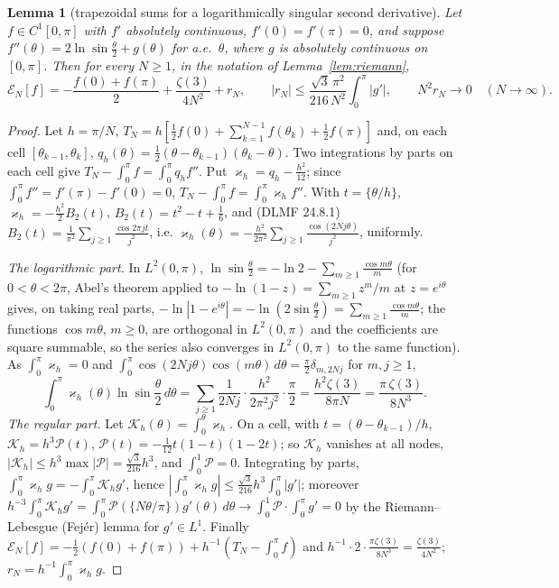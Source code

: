 \documentclass[11pt,a4paper]{article}
\theoremstyle{plain}
\newtheorem{lemma}[theorem]{Lemma}
\theoremstyle{definition}
\numberwithin{equation}{section}
\begin{document}
\begin{lemma}[trapezoidal sums for a logarithmically singular second derivative]\label{lem:traplog}
Let $f\in C^1[0,\pi]$ with $f'$ absolutely continuous, $f'(0)=f'(\pi)=0$, and suppose $f''(\theta)=2\ln\sin\frac\theta2+g(\theta)$ for a.e.\ $\theta$, where $g$ is absolutely continuous on $[0,\pi]$. Then for every $N\ge1$, in the notation of Lemma~\ref{lem:riemann},
\[
\mathcal E_N[f]=-\frac{f(0)+f(\pi)}2+\frac{\zeta(3)}{4N^2}+r_N,\qquad|r_N|\le\frac{\sqrt3\,\pi^2}{216\,N^2}\int_0^\pi|g'|,\qquad N^2r_N\to0\quad(N\to\infty).
\]
\end{lemma}
\begin{proof}
Let $h=\pi/N$, $T_N=h[\frac12f(0)+\sum_{k=1}^{N-1}f(\theta_k)+\frac12f(\pi)]$ and, on each cell $[\theta_{k-1},\theta_k]$, $q_h(\theta)=\frac12(\theta-\theta_{k-1})(\theta_k-\theta)$. Two integrations by parts on each cell give $T_N-\int_0^\pi f=\int_0^\pi q_hf''$. Put $\varkappa_h=q_h-\frac{h^2}{12}$; since $\int_0^\pi f''=f'(\pi)-f'(0)=0$, $T_N-\int_0^\pi f=\int_0^\pi\varkappa_hf''$. With $t=\{\theta/h\}$, $\varkappa_h=-\frac{h^2}{2}B_2(t)$, $B_2(t)=t^2-t+\frac16$, and (DLMF 24.8.1) $B_2(t)=\frac1{\pi^2}\sum_{j\ge1}\frac{\cos2\pi jt}{j^2}$, i.e.
$\varkappa_h(\theta)=-\frac{h^2}{2\pi^2}\sum_{j\ge1}\frac{\cos(2Nj\theta)}{j^2}$, uniformly.

\emph{The logarithmic part.} In $L^2(0,\pi)$, $\ln\sin\frac\theta2=-\ln2-\sum_{m\ge1}\frac{\cos m\theta}{m}$ (for $0<\theta<2\pi$, Abel's theorem applied to $-\ln(1-z)=\sum_{m\ge1}z^m/m$ at $z=e^{i\theta}$ gives, on taking real parts, $-\ln|1-e^{i\theta}|=-\ln(2\sin\frac\theta2)=\sum_{m\ge1}\frac{\cos m\theta}{m}$; the functions $\cos m\theta$, $m\ge0$, are orthogonal in $L^2(0,\pi)$ and the coefficients are square summable, so the series also converges in $L^2(0,\pi)$ to the same function). As $\int_0^\pi\varkappa_h=0$ and $\int_0^\pi\cos(2Nj\theta)\cos(m\theta)\,d\theta=\frac\pi2\delta_{m,2Nj}$ for $m,j\ge1$,
\[
\int_0^\pi\varkappa_h(\theta)\ln\sin\frac\theta2\,d\theta=\sum_{j\ge1}\frac1{2Nj}\cdot\frac{h^2}{2\pi^2j^2}\cdot\frac\pi2=\frac{h^2\zeta(3)}{8\pi N}=\frac{\pi\,\zeta(3)}{8N^3}.
\]
\emph{The regular part.} Let $\mathcal K_h(\theta)=\int_0^\theta\varkappa_h$. On a cell, with $t=(\theta-\theta_{k-1})/h$, $\mathcal K_h=h^3\mathcal P(t)$, $\mathcal P(t)=-\frac1{12}t(1-t)(1-2t)$; so $\mathcal K_h$ vanishes at all nodes, $|\mathcal K_h|\le h^3\max|\mathcal P|=\frac{\sqrt3}{216}h^3$, and $\int_0^1\mathcal P=0$. Integrating by parts, $\int_0^\pi\varkappa_hg=-\int_0^\pi\mathcal K_hg'$, hence $|\int_0^\pi\varkappa_hg|\le\frac{\sqrt3}{216}h^3\int_0^\pi|g'|$; moreover $h^{-3}\int_0^\pi\mathcal K_hg'=\int_0^\pi\mathcal P(\{N\theta/\pi\})g'(\theta)\,d\theta\to\int_0^1\mathcal P\cdot\int_0^\pi g'=0$ by the Riemann--Lebesgue (Fej\'er) lemma for $g'\in L^1$.
Finally $\mathcal E_N[f]=-\frac12(f(0)+f(\pi))+h^{-1}(T_N-\int_0^\pi f)$ and $h^{-1}\cdot2\cdot\frac{\pi\zeta(3)}{8N^3}=\frac{\zeta(3)}{4N^2}$; $r_N=h^{-1}\int_0^\pi\varkappa_hg$.
\end{proof}
\end{document}
